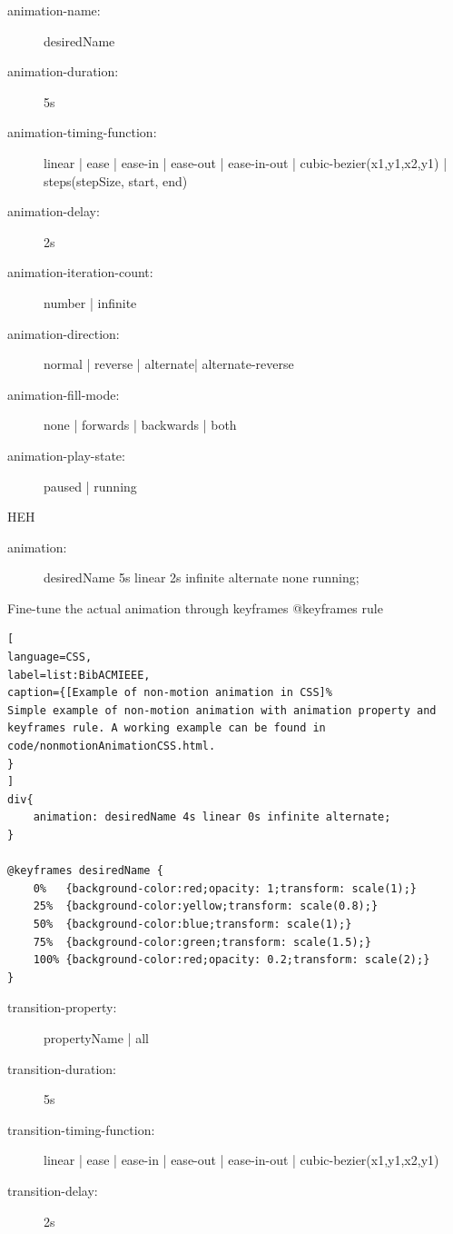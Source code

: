 \begin{description}
\item [animation-name:] desiredName
\item [animation-duration:] 5s
\item [animation-timing-function:] linear | ease | ease-in | ease-out | ease-in-out | cubic-bezier(x1,y1,x2,y1) | steps(stepSize, start, end)
\item [animation-delay:] 2s
\item [animation-iteration-count:] number | infinite
\item [animation-direction:] normal | reverse | alternate| alternate-reverse
\item [animation-fill-mode:] none | forwards | backwards | both
\item [animation-play-state:] paused | running
\end{description}
HEH

\begin{description}
\item [animation:] desiredName 5s linear 2s infinite alternate none running;
\end{description}

Fine-tune the actual animation through keyframes
@keyframes rule


\begin{lstlisting}[
language=CSS,
label=list:BibACMIEEE,
caption={[Example of non-motion animation in CSS]%
Simple example of non-motion animation with animation property and keyframes rule. A working example can be found in code/nonmotionAnimationCSS.html.
}
]
div{
	animation: desiredName 4s linear 0s infinite alternate;
}

@keyframes desiredName {
	0%   {background-color:red;opacity: 1;transform: scale(1);}
	25%  {background-color:yellow;transform: scale(0.8);}
	50%  {background-color:blue;transform: scale(1);}
	75%  {background-color:green;transform: scale(1.5);}
	100% {background-color:red;opacity: 0.2;transform: scale(2);}
}
\end{lstlisting}


\label{sub:CSS_transition}


\begin{description}
\item [transition-property:] propertyName | all
\item [transition-duration:] 5s
\item [transition-timing-function:] linear | ease | ease-in | ease-out | ease-in-out | cubic-bezier(x1,y1,x2,y1)
\item [transition-delay:] 2s
\end{description}



